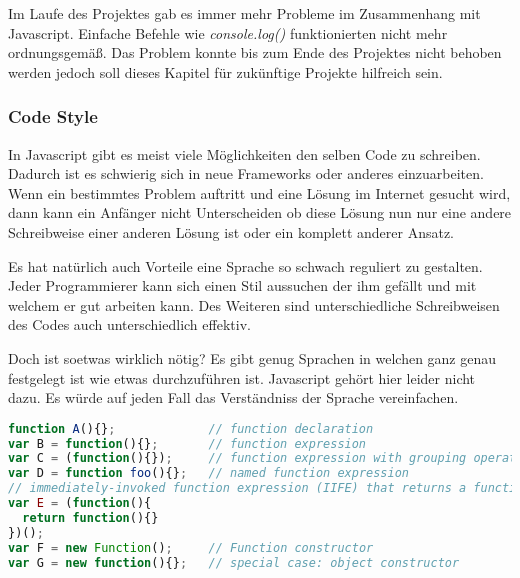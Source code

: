
Im Laufe des Projektes gab es immer mehr Probleme im Zusammenhang mit Javascript. Einfache Befehle wie \textit{console.log()} funktionierten nicht mehr ordnungsgemäß. Das Problem konnte bis zum Ende des Projektes nicht behoben werden jedoch soll dieses Kapitel für zukünftige Projekte hilfreich sein.

\subsubsection{Code Style}
In Javascript gibt es meist viele Möglichkeiten den selben Code zu schreiben. Dadurch ist es schwierig sich in neue Frameworks oder anderes einzuarbeiten. Wenn ein bestimmtes Problem auftritt und eine Lösung im Internet gesucht wird, dann kann ein Anfänger nicht Unterscheiden ob diese Lösung nun nur eine andere Schreibweise einer anderen Lösung ist oder ein komplett anderer Ansatz. 

Es hat natürlich auch Vorteile eine Sprache so schwach reguliert zu gestalten. Jeder Programmierer kann sich einen Stil aussuchen der ihm gefällt und mit welchem er gut arbeiten kann. Des Weiteren sind unterschiedliche Schreibweisen des Codes auch unterschiedlich effektiv. 

Doch ist soetwas wirklich nötig? Es gibt genug Sprachen in welchen ganz genau festgelegt ist wie etwas durchzuführen ist. Javascript gehört hier leider nicht dazu. Es würde auf jeden Fall das Verständniss der Sprache vereinfachen. 

\begin{lstlisting}[caption = Unterschiedliche Möglichkeiten eine Funktion zu deklarieren\cite{JSOP1}, label = jsopfn, language=Javascript]
function A(){};             // function declaration
var B = function(){};       // function expression
var C = (function(){});     // function expression with grouping operators
var D = function foo(){};   // named function expression
// immediately-invoked function expression (IIFE) that returns a function
var E = (function(){ 
  return function(){}
})();
var F = new Function();     // Function constructor
var G = new function(){};   // special case: object constructor

\end{lstlisting}

